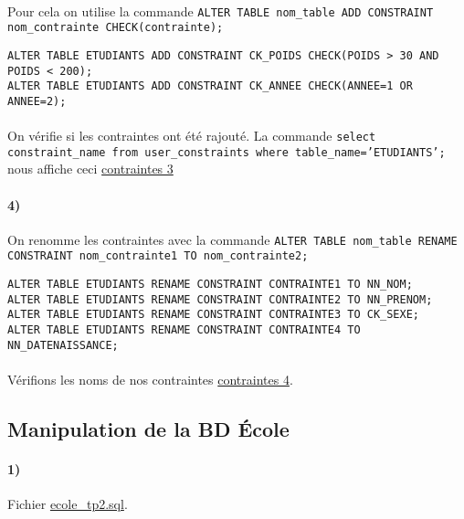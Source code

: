 \documentclass{report}
\begin{document}
\paragraph{}Pour cela on utilise la commande {\tt ALTER TABLE nom\_table ADD CONSTRAINT nom\_contrainte CHECK(contrainte);}

\begin{lstlisting}
ALTER TABLE ETUDIANTS ADD CONSTRAINT CK_POIDS CHECK(POIDS > 30 AND POIDS < 200);
ALTER TABLE ETUDIANTS ADD CONSTRAINT CK_ANNEE CHECK(ANNEE=1 OR ANNEE=2);
\end{lstlisting}

\paragraph{}On vérifie si les contraintes ont été rajouté. La commande {\tt select constraint\_name from user\_constraints \newline where table\_name='ETUDIANTS';} nous affiche ceci \href{run:./Images/TP2/tp2_contrainte3.png}{contraintes 3}

\paragraph{4)}On renomme les contraintes avec la commande {\tt ALTER TABLE nom\_table RENAME CONSTRAINT nom\_contrainte1 TO nom\_contrainte2;}

\begin{lstlisting}
ALTER TABLE ETUDIANTS RENAME CONSTRAINT CONTRAINTE1 TO NN_NOM;
ALTER TABLE ETUDIANTS RENAME CONSTRAINT CONTRAINTE2 TO NN_PRENOM;
ALTER TABLE ETUDIANTS RENAME CONSTRAINT CONTRAINTE3 TO CK_SEXE;
ALTER TABLE ETUDIANTS RENAME CONSTRAINT CONTRAINTE4 TO NN_DATENAISSANCE;
\end{lstlisting}

\paragraph{}Vérifions les noms de nos contraintes \href{run:./Images/TP2/tp2_contrainte4.png}{contraintes 4}.

\subsection{Manipulation de la BD École}

\paragraph{1)}Fichier \href{./TP2/ecole_tp2.sql}{ecole\_tp2.sql}.
\end{document}
